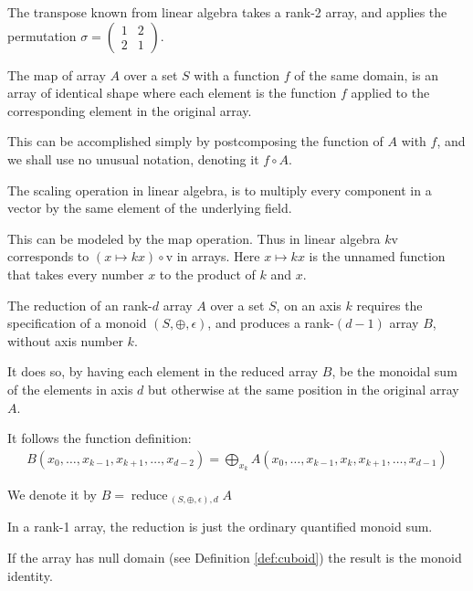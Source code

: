 \documentclass{DIKU-report-variant}
\newcommand\mrm[1]{\mathrm{#1}}
\newcommand\brm[1]{\bm{\mrm{#1}}}
\newcommand\reduce{\operatorname*{\brm{reduce}\,}}
\begin{document}
\begin{example}
  \label{ex:transpose}
  The transpose known from linear algebra takes a rank-2 array, and
  applies the permutation \(\sigma = \left(\begin{smallmatrix} 1 & 2 \\ 2 & 1 \end{smallmatrix}\right)\).
\end{example}

\begin{definition}
  \label{def:map}
  The map of array \(A\) over a set \(S\) with a function \(f\) of the same domain,
  is an array of identical shape where each element is the function \(f\) applied to
  the corresponding element in the original array.

  This can be accomplished simply by postcomposing the function of \(A\)
  with \(f\), and we shall use no unusual notation, denoting it \(f \circ A\).
\end{definition}

\begin{example}
  \label{ex:scaling}
  The scaling operation in linear algebra, is to multiply every component in
  a vector by the same element of the underlying field.

  This can be modeled by the map operation. Thus in linear algebra \(k\brm v\)
  corresponds to \((x \mapsto kx) \circ \brm v\) in arrays. Here \(x \mapsto kx\) is
  the unnamed function that takes every number \(x\) to the product of \(k\) and \(x\).
\end{example}

\begin{definition}
  \label{def:reduce}
  The reduction of an rank-\(d\) array \(A\) over a set \(S\), on
  an axis \(k\) requires the specification of a monoid
  \((S, \oplus, \epsilon)\), and produces a rank-\((d-1)\) array \(B\), without
  axis number \(k\).

  It does so, by having each element in the reduced array \(B\), be the monoidal sum
  of the elements in axis \(d\) but otherwise at the same position in the original array \(A\).

  It follows the function definition:
  \begin{align*}
    B(x_0,\dots,x_{k-1},x_{k+1},\dots,x_{d-2}) = \bigoplus_{x_k} A(x_0,\dots,x_{k-1},x_k,x_{k+1},\dots,x_{d-1})
  \end{align*}

  We denote it by \( B = \reduce_{(S, \oplus, \epsilon),d} A \)

  In a rank-1 array, the reduction is just the ordinary quantified monoid sum.

  If the array has null domain (see Definition \ref{def:cuboid}) the result is
  the monoid identity.
\end{definition}
\end{document}
